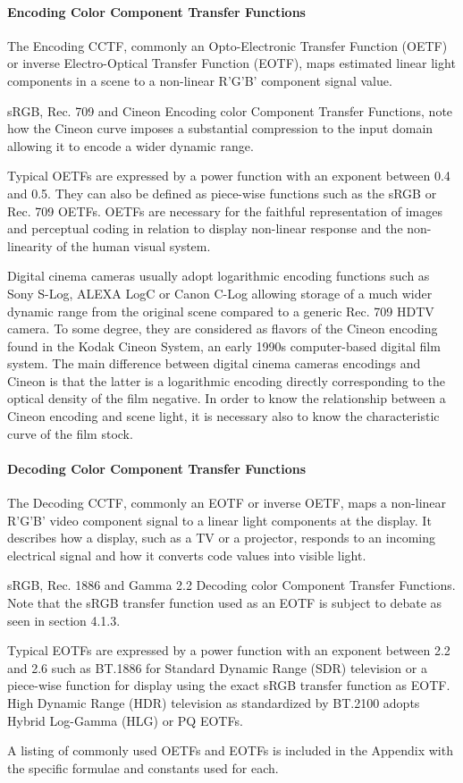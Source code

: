 \paragraph{Encoding Color Component Transfer Functions}

The Encoding CCTF, commonly an Opto-Electronic Transfer Function (OETF) or inverse Electro-Optical Transfer Function (EOTF), maps estimated linear light components in a scene to a non-linear R'G'B' component signal value.

sRGB, Rec. 709 and Cineon Encoding color Component Transfer Functions, note how the Cineon curve imposes a substantial compression to the input domain allowing it to encode a wider dynamic range.

Typical OETFs are expressed by a power function with an exponent between 0.4 and 0.5. They can also be defined as piece-wise functions such as the sRGB or Rec. 709 OETFs. OETFs are necessary for the faithful representation of images and perceptual coding in relation to display non-linear response and the non-linearity of the human visual system.

Digital cinema cameras usually adopt logarithmic encoding functions such as Sony S-Log, ALEXA LogC or Canon C-Log allowing storage of a much wider dynamic range from the original scene compared to a generic Rec. 709 HDTV camera. To some degree, they are considered as flavors of the Cineon encoding found in the Kodak Cineon System, an early 1990s computer-based digital film system. The main difference between digital cinema cameras encodings and Cineon is that the latter is a logarithmic encoding directly corresponding to the optical density of the film negative. In order to know the relationship between a Cineon encoding and scene light, it is necessary also to know the characteristic curve of the film stock.


\paragraph{Decoding Color Component Transfer Functions}

The Decoding CCTF, commonly an EOTF or inverse OETF, maps a non-linear R'G'B' video component signal to a linear light components at the display. It describes how a display, such as a TV or a projector, responds to an incoming electrical signal and how it converts code values into visible light.


sRGB, Rec. 1886 and Gamma 2.2 Decoding color Component Transfer Functions. Note that the sRGB transfer function used as an EOTF is subject to debate as seen in section 4.1.3.

Typical EOTFs are expressed by a power function with an exponent between 2.2 and 2.6 such as BT.1886 for Standard Dynamic Range (SDR) television or a piece-wise function for display using the exact sRGB transfer function as EOTF. High Dynamic Range (HDR) television as standardized by BT.2100 adopts Hybrid Log-Gamma (HLG) or PQ EOTFs.

A listing of commonly used OETFs and EOTFs is included in the Appendix with the specific formulae and constants used for each.

